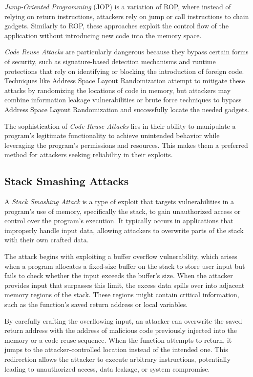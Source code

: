 \textit{Jump-Oriented Programming} (JOP) is a variation of ROP, where instead of
relying on return instructions, attackers rely on jump or call instructions to
chain gadgets. Similarly to ROP, these approaches exploit the control flow of
the application without introducing new code into the memory space.

\textit{Code Reuse Attacks} are particularly dangerous because they bypass certain
forms of security, such as signature-based detection mechanisms and runtime
protections that rely on identifying or blocking the introduction of foreign
code. Techniques like Address Space Layout Randomization attempt to mitigate these
attacks by randomizing the locations of code in memory, but attackers may
combine information leakage vulnerabilities or brute force techniques to bypass
Address Space Layout Randomization and successfully locate the needed gadgets.

The sophistication of \textit{Code Reuse Attacks} lies in their ability to manipulate
a program's legitimate functionality to achieve unintended behavior while leveraging
the program's permissions and resources. This makes them a preferred method for
attackers seeking reliability in their exploits.

\subsection{Stack Smashing Attacks}
\label{subsec:background_stacksmashing}

A \textit{Stack Smashing Attack} is a type of exploit that targets
vulnerabilities in a program's use of memory, specifically the stack, to gain
unauthorized access or control over the program's execution. It typically occurs
in applications that improperly handle input data, allowing attackers to
overwrite parts of the stack with their own crafted data.

The attack begins with exploiting a buffer overflow vulnerability, which arises when
a program allocates a fixed-size buffer on the stack to store user input but fails
to check whether the input exceeds the buffer's size. When the attacker provides
input that surpasses this limit, the excess data spills over into adjacent memory
regions of the stack. These regions might contain critical information, such as the
function's saved return address or local variables.

By carefully crafting the overflowing input, an attacker can overwrite the saved
return address with the address of malicious code previously injected into the
memory or a code reuse sequence. When the function attempts to return, it jumps
to the attacker-controlled location instead of the intended one. This redirection
allows the attacker to execute arbitrary instructions, potentially leading to
unauthorized access, data leakage, or system compromise.

